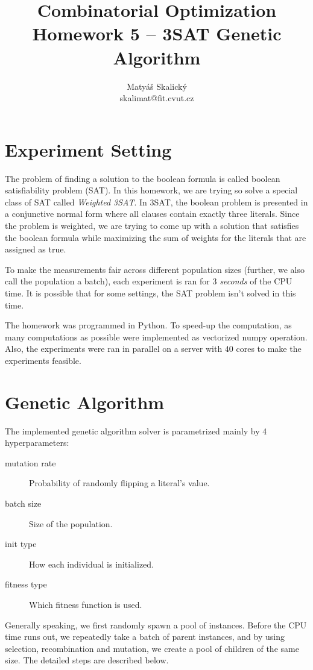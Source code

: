 \documentclass[a4paper,10pt]{article}
\title{Combinatorial Optimization\\Homework 5 – 3SAT Genetic Algorithm}
\author{Matyáš Skalický\\skalimat@fit.cvut.cz}
\begin{document}
\maketitle
\tableofcontents
\medskip

\section{Experiment Setting}
The problem of finding a solution to the boolean formula is called boolean satisfiability problem (SAT). In this homework, we are trying so solve a special class of SAT called \emph{Weighted 3SAT}. In 3SAT, the boolean problem is presented in a conjunctive normal form where all clauses contain exactly three literals. Since the problem is weighted, we are trying to come up with a solution that satisfies the boolean formula while maximizing the sum of weights for the literals that are assigned as true.

To make the measurements fair across different population sizes (further, we also call the population a batch), each experiment is ran for \emph{$3$ seconds} of the CPU time. It is possible that for some settings, the SAT problem isn't solved in this time.

The homework was programmed in Python. To speed-up the computation, as many computations as possible were implemented as vectorized numpy operation. Also, the experiments were ran in parallel on a server with $40$ cores to make the experiments feasible.

\section{Genetic Algorithm}

The implemented genetic algorithm solver is parametrized mainly by 4 hyperparameters:

\begin{description}
	\item[mutation rate]{Probability of randomly flipping a literal's value.}
	\item[batch size]{Size of the population.}
	\item[init type]{How each individual is initialized.}
	\item[fitness type]{Which fitness function is used.}
\end{description}

Generally speaking, we first randomly spawn a pool of instances. Before the CPU time runs out, we repeatedly take a batch of parent instances, and by using selection, recombination and mutation, we create a pool of children of the same size. The detailed steps are described below.
\end{document}
